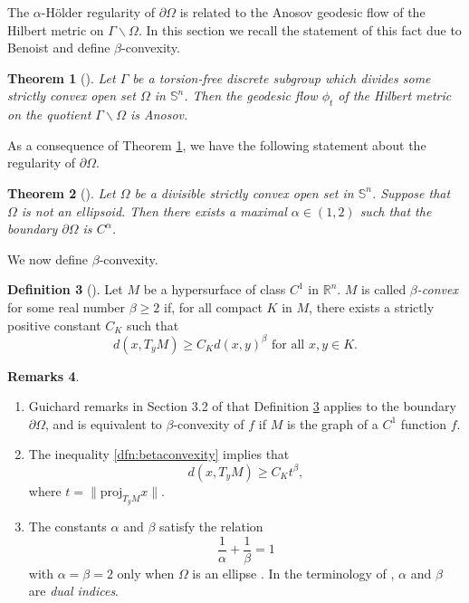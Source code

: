 \documentclass[letterpaper, 11pt, reqno]{amsart}
\newtheorem{thm}{Theorem}[section]
\theoremstyle{definition}
\newtheorem{dfn}[thm]{Definition}
\newtheorem{rems}[thm]{Remarks}
\begin{document}
The $\alpha$-H{\"o}lder regularity of $\partial \Omega$ is related to the Anosov geodesic flow of the Hilbert metric on $\Gamma \backslash \Omega$. In this section we recall the statement of this fact due to Benoist and define $\beta$-convexity.

\begin{thm}[\cite{Benoist}]\label{thm:anosov}
    Let $\Gamma$ be a torsion-free discrete subgroup which divides some strictly convex open set $\Omega$ in $\mathbb{S}^n$. Then the geodesic flow $\phi_t$ of the Hilbert metric on the quotient $\Gamma \backslash \Omega$ is Anosov.
\end{thm}

As a consequence of Theorem \ref{thm:anosov}, we have the following statement about the regularity of $\partial \Omega$.

\begin{thm}[\cite{Benoist}]\label{def:alpha}
    Let $\Omega$ be a divisible strictly convex open set in $\mathbb{S}^n$. Suppose that $\Omega$ is not an ellipsoid. Then there exists a maximal $\alpha \in (1,2)$ such that the boundary $\partial \Omega$ is $C^\alpha$.
\end{thm}

We now define $\beta$-convexity.

\begin{dfn}[\cite{Guichard}]\label{dfn:beta} Let $M$ be a hypersurface of class $C^1$ in $\mathbb{R}^n$. $M$ is called \emph{$\beta$-convex} for some real number $\beta \geq 2$  if, for all compact $K$ in $M$, there exists a strictly positive constant $C_K$ such that 
\begin{equation}\label{dfn:betaconvexity}
    d(x,T_yM) \geq C_Kd(x,y)^\beta \text{ for all } x, y \in K.
\end{equation}
\end{dfn}

\begin{rems} \hfill\\
\begin{enumerate}
    \item Guichard remarks in Section 3.2 of \cite{Guichard} that Definition \ref{dfn:beta} applies to the boundary $\partial \Omega$, and is equivalent to $\beta$-convexity of $f$ if $M$ is the graph of a $C^1$ function $f$.
    \item The inequality \ref{dfn:betaconvexity} implies that 
    \begin{equation}\label{dfn:betafunction}
    d(x,T_yM) \geq C_Kt^\beta,
    \end{equation}
    where $t=\|\text{proj}_{T_yM}x\|$.
    \item The constants $\alpha$ and $\beta$ satisfy the relation
    \begin{equation}
        \frac{1}{\alpha} + \frac{1}{\beta} = 1
    \end{equation}
    with $\alpha = \beta = 2$ only when $\Omega$ is an ellipse \cite{Guichard}. In the terminology of \cite{BCL}, $\alpha$ and $\beta$ are \textit{dual indices}.

\end{enumerate}

\end{rems}
\end{document}
